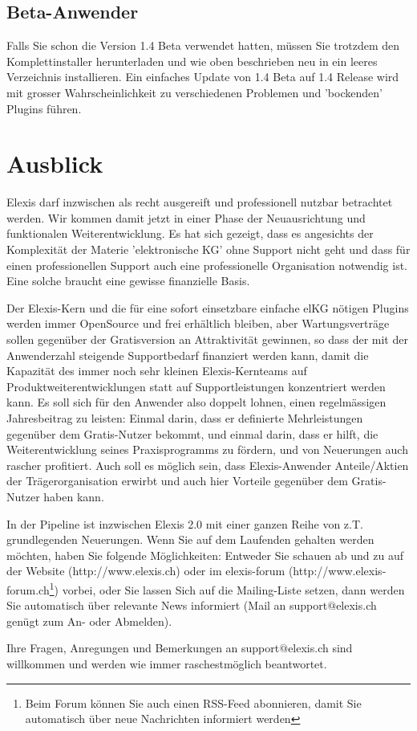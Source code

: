 \documentclass[a4paper]{scrartcl}
\begin{document}
\subsection{Beta-Anwender}
Falls Sie schon die Version 1.4 Beta verwendet hatten, müssen Sie trotzdem den Komplettinstaller herunterladen und wie oben beschrieben neu in ein leeres Verzeichnis installieren. Ein einfaches Update von 1.4 Beta auf 1.4 Release wird mit grosser Wahrscheinlichkeit zu verschiedenen Problemen und 'bockenden' Plugins  führen.

\section{Ausblick}
Elexis darf inzwischen als recht ausgereift und professionell nutzbar betrachtet werden. Wir kommen damit jetzt in einer Phase der Neuausrichtung und funktionalen Weiterentwicklung. Es hat sich gezeigt, dass es angesichts der Komplexität der Materie 'elektronische KG' ohne Support nicht geht und dass für einen professionellen Support auch eine professionelle Organisation notwendig ist. Eine solche braucht eine gewisse finanzielle Basis.

Der Elexis-Kern und die für eine sofort einsetzbare einfache elKG nötigen Plugins werden immer OpenSource und frei erhältlich bleiben, aber Wartungsverträge sollen gegenüber der Gratisversion an Attraktivität gewinnen, so dass der mit der Anwenderzahl steigende Supportbedarf finanziert werden kann, damit die Kapazität des immer noch sehr kleinen Elexis-Kernteams auf Produktweiterentwicklungen statt auf Supportleistungen konzentriert werden kann. Es soll sich für den Anwender also doppelt lohnen, einen regelmässigen Jahresbeitrag zu leisten: Einmal darin, dass er definierte Mehrleistungen gegenüber dem Gratis-Nutzer bekommt, und einmal darin, dass er hilft, die Weiterentwicklung seines Praxisprogramms zu fördern, und von Neuerungen auch rascher profitiert. Auch soll es möglich sein, dass Elexis-Anwender Anteile/Aktien der Trägerorganisation erwirbt und auch hier Vorteile gegenüber dem Gratis-Nutzer haben kann.

\medskip

In der Pipeline ist inzwischen Elexis 2.0 mit einer ganzen Reihe von z.T. grundlegenden Neuerungen. Wenn Sie auf dem Laufenden gehalten werden möchten, haben Sie folgende Möglichkeiten: Entweder Sie schauen ab und zu auf der Website (http://www.elexis.ch) oder im elexis-forum (http://www.elexis-forum.ch\footnote{Beim Forum können Sie auch einen RSS-Feed abonnieren, damit Sie automatisch über neue Nachrichten informiert werden}) vorbei, oder Sie lassen Sich auf die Mailing-Liste setzen, dann werden Sie automatisch über relevante News informiert (Mail an support$@$elexis.ch genügt zum An- oder Abmelden).

\medskip

Ihre Fragen, Anregungen und Bemerkungen an support$@$elexis.ch sind willkommen und werden wie immer raschestmöglich beantwortet.
\end{document}
